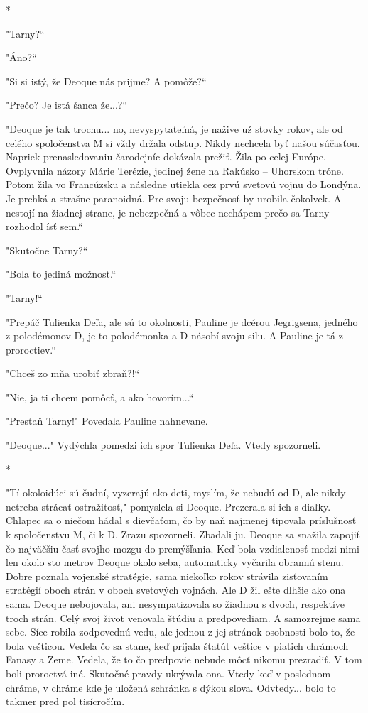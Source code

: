 \documentclass{book}
\begin{document}
\begin{center}
*
\end{center}

"Tarny?“

"Áno?“

"Si si istý, že Deoque nás prijme? A pomôže?“

"Prečo? Je istá šanca že...?“

"Deoque je tak trochu... no, nevyspytateľná, je nažive už stovky rokov, ale od celého spoločenstva M si vždy držala odstup. Nikdy nechcela byť našou súčasťou. Napriek prenasledovaniu čarodejníc dokázala prežiť. Žila po celej Európe. Ovplyvnila názory Márie Terézie, jedinej žene na Rakúsko – Uhorskom tróne. Potom žila vo Francúzsku a následne utiekla cez prvú svetovú vojnu do Londýna. Je prchká a strašne paranoidná. Pre svoju bezpečnosť by urobila čokoľvek. A nestojí na žiadnej strane, je nebezpečná a vôbec nechápem prečo sa Tarny rozhodol ísť sem.“

"Skutočne Tarny?“

"Bola to jediná možnosť.“

"Tarny!“

"Prepáč Tulienka Deľa, ale sú to okolnosti, Pauline je dcérou Jegrigsena, jedného z polodémonov D, je to polodémonka a D násobí svoju silu. A Pauline je tá z proroctiev.“

"Chceš zo mňa urobiť zbraň?!“

"Nie, ja ti chcem pomôcť, a ako hovorím...“

"Prestaň Tarny!"$ $ Povedala Pauline nahnevane.

"Deoque..."$ $ Vydýchla pomedzi ich spor Tulienka Deľa. Vtedy spozorneli.

\begin{center}
*
\end{center}

"Tí okoloidúci sú čudní, vyzerajú ako deti, myslím, že nebudú od D, ale nikdy netreba strácať ostražitosť,"$ $ pomyslela si Deoque. Prezerala si ich s diaľky. Chlapec sa o niečom hádal s dievčaťom, čo by naň najmenej tipovala príslušnosť k spoločenstvu M, či k D. Zrazu spozorneli. Zbadali ju. Deoque sa snažila zapojiť čo najväčšiu časť svojho mozgu do premýšľania. Keď bola vzdialenosť medzi nimi len okolo sto metrov Deoque okolo seba, automaticky vyčarila obrannú stenu. Dobre poznala vojenské stratégie, sama niekoľko rokov strávila zisťovaním stratégií oboch strán v oboch svetových vojnách. Ale D žil ešte dlhšie ako ona sama. Deoque nebojovala, ani nesympatizovala so žiadnou s dvoch, respektíve troch strán. Celý svoj život venovala štúdiu a predpovediam. A samozrejme sama sebe. Síce robila zodpovednú vedu, ale jednou z jej stránok osobnosti bolo to, že bola vešticou. Vedela čo sa stane, keď prijala štatút veštice v piatich chrámoch Fanasy a Zeme. Vedela, že to čo predpovie nebude môcť nikomu prezradiť. V tom boli proroctvá iné. Skutočné pravdy ukrývala ona. Vtedy keď v poslednom chráme, v chráme kde je uložená schránka s dýkou slova. Odvtedy... bolo to takmer pred pol tisícročím.
\end{document}
